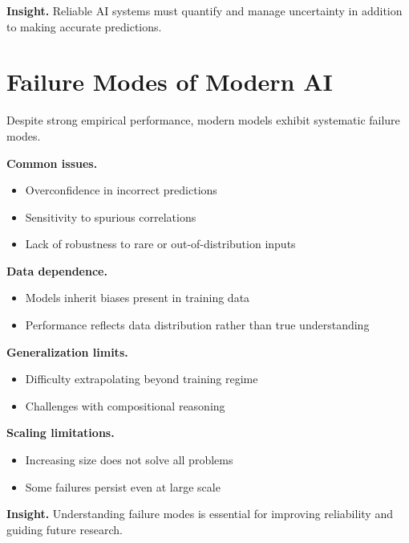 \medskip

\noindent
\textbf{Insight.}  
Reliable AI systems must quantify and manage uncertainty in addition to making accurate predictions.

\section{Failure Modes of Modern AI}

Despite strong empirical performance, modern models exhibit systematic failure modes.

\medskip

\noindent
\textbf{Common issues.}
\begin{itemize}
    \item Overconfidence in incorrect predictions
    \item Sensitivity to spurious correlations
    \item Lack of robustness to rare or out-of-distribution inputs
\end{itemize}

\medskip

\noindent
\textbf{Data dependence.}
\begin{itemize}
    \item Models inherit biases present in training data
    \item Performance reflects data distribution rather than true understanding
\end{itemize}

\medskip

\noindent
\textbf{Generalization limits.}
\begin{itemize}
    \item Difficulty extrapolating beyond training regime
    \item Challenges with compositional reasoning
\end{itemize}

\medskip

\noindent
\textbf{Scaling limitations.}
\begin{itemize}
    \item Increasing size does not solve all problems
    \item Some failures persist even at large scale
\end{itemize}

\medskip

\noindent
\textbf{Insight.}  
Understanding failure modes is essential for improving reliability and guiding future research.

